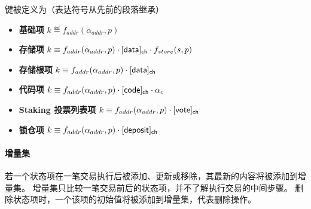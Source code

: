 键被定义为（表达符号从先前的段落继承）
\begin{itemize}[nosep]
	\item {\bf 基础项}
	$k\eqdef f_{addr}(\alpha_{addr},p)$
	\item {\bf 存储项} 
	$k\equiv f_{addr}(\alpha_{addr},p)\cdot [{\sf data}]_{\sf ch}\cdot f_{store}(s,p)$
	\item {\bf 存储根项}
	$k\equiv f_{addr}(\alpha_{addr},p)\cdot [{\sf data}]_{\sf ch}$
	\item {\bf 代码项} $k\equiv f_{addr}(\alpha_{addr},p)\cdot [{\sf code}]_{\sf ch}\cdot \alpha_c$
	\item {\bf Staking 投票列表项} $k\equiv f_{addr}(\alpha_{addr},p)\cdot [{\sf vote}]_{\sf ch}$
	\item {\bf 锁仓项} $k\equiv f_{addr}(\alpha_{addr},p)\cdot [{\sf deposit}]_{\sf ch}$
 
\end{itemize}

\paragraph{增量集}

若一个状态项在一笔交易执行后被添加、更新或移除，其最新的内容将被添加到增量集。
增量集只比较一笔交易前后的状态项，并不了解执行交易的中间步骤。
%
删除状态项时，一个该项的初始值将被添加到增量集，代表删除操作。

